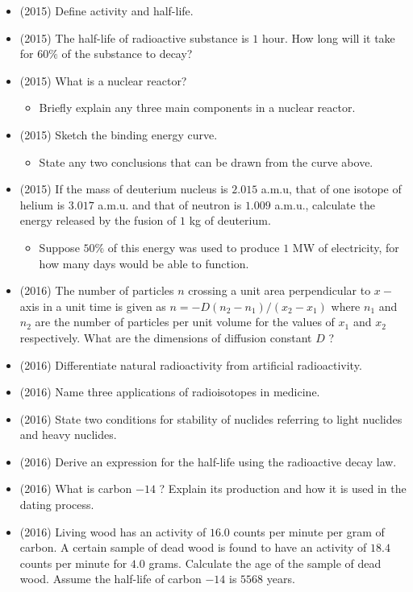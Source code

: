 \documentclass{article}
\begin{document}
\begin{itemize}
\item (2015)  Define activity and half-life.
\item (2015)  The half-life of radioactive substance is $ 1$ hour.  How long will it take for $ 60\%$ of the substance to decay?
\item (2015)  What is a nuclear reactor?
 \begin{itemize}
\item Briefly explain any three main components in a nuclear reactor.
\end{itemize}
\item (2015)  Sketch the binding energy curve.
 \begin{itemize}
\item State any two conclusions that can be drawn from the curve above.
\end{itemize}
\item (2015)  If the mass of deuterium nucleus is $ 2.015$ a.m.u, that of one isotope of helium is $ 3.017$ a.m.u. and that of neutron is $ 1.009$ a.m.u., calculate the energy released by the fusion of $ 1$ kg of deuterium. 
 \begin{itemize}
\item Suppose $ 50\%$ of this energy was used to produce $ 1$ MW of electricity, for how many days would be able to function.
\end{itemize}
\item (2016)  The number of particles $ n$ crossing a unit area perpendicular to $ x-$ axis in a unit time is given as $ n=-D(n_{2}-n_{1})/(x_{2}-x_{1})$ where $ n_{1}$ and $ n_{2}$ are the number of particles per unit volume for the values of $ x_{1}$ and $ x_{2}$ respectively.  What are the dimensions of diffusion constant $ D$ ?
\item (2016)  Differentiate natural radioactivity from artificial radioactivity.
\item (2016)  Name three applications of radioisotopes in medicine.
\item (2016)  State two conditions for stability of nuclides referring to light nuclides and heavy nuclides.
\item (2016)  Derive an expression for the half-life using the radioactive decay law.
\item (2016)  What is carbon $ -14$ ?  Explain its production and how it is used in the dating process.
\item (2016)  Living wood has an activity of $ 16.0$ counts per minute per gram of carbon.  A certain sample of dead wood is found to have an activity of $ 18.4$ counts per minute for $ 4.0$ grams.  Calculate the age of the sample of dead wood.  Assume the half-life of carbon $ -14$ is $ 5568$ years.

\end{itemize}
\end{document}
